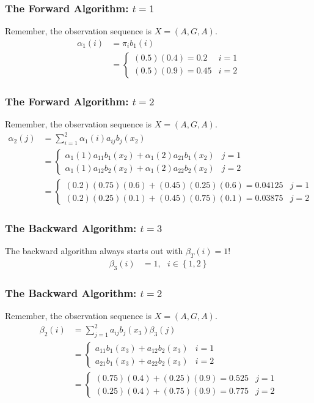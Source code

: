 \documentclass{beamer}
\begin{document}
\begin{frame}
  \frametitle{The Forward Algorithm: $t=1$}

  Remember, the observation sequence is $X=(A,G,A)$.
  \begin{align*}
  \alpha_1(i) &= \pi_i b_1(i) \\
  &= \begin{cases} (0.5)(0.4)=0.2  & i=1\\(0.5)(0.9)=0.45 & i=2\end{cases}
  \end{align*}
\end{frame}

\begin{frame}
  \frametitle{The Forward Algorithm: $t=2$}

  Remember, the observation sequence is $X=(A,G,A)$.
  \begin{align*}
  \alpha_2(j) &= \sum_{i=1}^2 \alpha_1(i)a_{ij}b_j(x_2)\\
  &= \begin{cases}
    \alpha_1(1)a_{11}b_1(x_2)+\alpha_1(2)a_{21}b_1(x_2) & j=1\\
    \alpha_1(1)a_{12}b_2(x_2)+\alpha_1(2)a_{22}b_2(x_2) & j=2
  \end{cases}\\
  &= \begin{cases}
    (0.2)(0.75)(0.6)+(0.45)(0.25)(0.6)=0.04125  & j=1\\
    (0.2)(0.25)(0.1)+(0.45)(0.75)(0.1)=0.03875 &  j=2
  \end{cases}
  \end{align*}
  
\end{frame}

\begin{frame}
  \frametitle{The Backward Algorithm: $t=3$}

  The backward algorithm always starts out with $\beta_T(i)=1$! 
  \begin{align*}
  \beta_3(i) &= 1,~~~i\in\left\{1,2\right\}
  \end{align*}
  
\end{frame}

\begin{frame}
  \frametitle{The Backward Algorithm: $t=2$}

  Remember, the observation sequence is $X=(A,G,A)$.
  \begin{align*}
  \beta_2(i) &= \sum_{j=1}^2 a_{ij}b_j(x_3)\beta_3(j)\\
  &= \begin{cases}
    a_{11}b_1(x_3)+a_{12}b_2(x_3) & i=1\\
    a_{21}b_1(x_3)+a_{22}b_2(x_3) & i=2
  \end{cases}\\
  &= \begin{cases}
    (0.75)(0.4)+(0.25)(0.9)=0.525 & j=1\\
    (0.25)(0.4)+(0.75)(0.9)=0.775 & j=2
  \end{cases}
  \end{align*}  
\end{frame}
\end{document}
